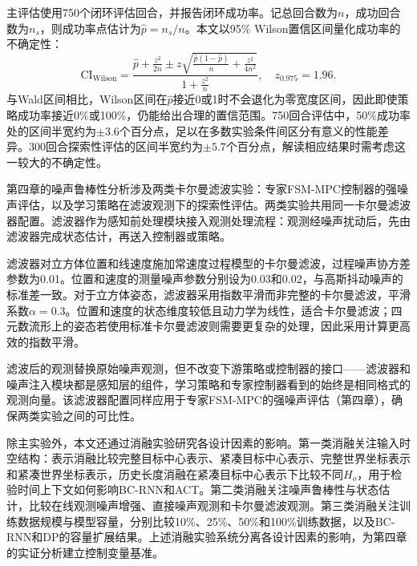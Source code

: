 主评估使用750个闭环评估回合，并报告闭环成功率。记总回合数为$n$，成功回合数为$n_s$，则成功率点估计为$\hat{p}=n_s/n$。本文以95\% Wilson置信区间量化成功率的不确定性\citep{wilson1927probable}：
\begin{equation}
    \mathrm{CI}_\mathrm{Wilson} =
    \frac{\hat{p} + \frac{z^2}{2n} \pm z\sqrt{\frac{\hat{p}(1-\hat{p})}{n} + \frac{z^2}{4n^2}}}{1 + \frac{z^2}{n}},
    \quad z_{0.975}=1.96.
    \label{eq:wilson-ci}
\end{equation}
与Wald区间相比，Wilson区间在$\hat{p}$接近0或1时不会退化为零宽度区间，因此即使策略成功率接近0\%或100\%，仍能给出合理的置信范围。750回合评估中，50\%成功率处的区间半宽约为$\pm3.6$个百分点，足以在多数实验条件间区分有意义的性能差异。300回合探索性评估的区间半宽约为$\pm5.7$个百分点，解读相应结果时需考虑这一较大的不确定性。

第四章的噪声鲁棒性分析涉及两类卡尔曼滤波实验：专家FSM-MPC控制器的强噪声评估，以及学习策略在滤波观测下的探索性评估。两类实验共用同一卡尔曼滤波器配置。滤波器作为感知前处理模块接入观测处理流程：观测经噪声扰动后，先由滤波器完成状态估计，再送入控制器或策略。

滤波器对立方体位置和线速度施加常速度过程模型的卡尔曼滤波\citep{kalman1960new}，过程噪声协方差参数为0.01。位置和速度的测量噪声参数分别设为0.03和0.02，与高斯抖动噪声的标准差一致。对于立方体姿态，滤波器采用指数平滑而非完整的卡尔曼滤波，平滑系数$\alpha=0.3$。位置和速度的状态维度较低且动力学为线性，适合卡尔曼滤波；四元数流形上的姿态若使用标准卡尔曼滤波则需要更复杂的处理，因此采用计算更高效的指数平滑。

滤波后的观测替换原始噪声观测，但不改变下游策略或控制器的接口——滤波器和噪声注入模块都是感知层的组件，学习策略和专家控制器看到的始终是相同格式的观测向量。该滤波器配置同样应用于专家FSM-MPC的强噪声评估（第四章），确保两类实验之间的可比性。

除主实验外，本文还通过消融实验研究各设计因素的影响。第一类消融关注输入时空结构：表示消融比较完整目标中心表示、紧凑目标中心表示、完整世界坐标表示和紧凑世界坐标表示，历史长度消融在紧凑目标中心表示下比较不同$H_o$，用于检验时间上下文如何影响BC-RNN和ACT。第二类消融关注噪声鲁棒性与状态估计，比较在线观测噪声增强、直接噪声观测和卡尔曼滤波观测。第三类消融关注训练数据规模与模型容量，分别比较10\%、25\%、50\%和100\%训练数据，以及BC-RNN和DP的容量扩展结果。上述消融实验系统分离各设计因素的影响，为第四章的实证分析建立控制变量基准。